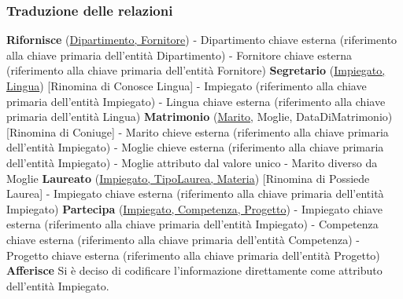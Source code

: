 \documentclass{article}
\begin{document}
\subsubsection{Traduzione delle relazioni}
\textbf{Rifornisce} (\underline{Dipartimento, Fornitore})
\newline
- Dipartimento chiave esterna (riferimento alla chiave primaria dell'entità Dipartimento)
\newline
- Fornitore chiave esterna (riferimento alla chiave primaria dell'entità Fornitore)
\newline
\newline
\textbf{Segretario} (\underline{Impiegato, Lingua}) [Rinomina di Conosce Lingua]
\newline
- Impiegato (riferimento alla chiave primaria dell'entità Impiegato)
\newline
- Lingua chiave esterna (riferimento alla chiave primaria dell'entità Lingua)
\newline
\newline
\textbf{Matrimonio} (\underline{Marito}, Moglie, DataDiMatrimonio) [Rinomina di Coniuge]
\newline
- Marito chieve esterna (riferimento alla chiave primaria dell'entità Impiegato)
\newline
- Moglie chieve esterna (riferimento alla chiave primaria dell'entità Impiegato)
\newline
- Moglie attributo dal valore unico
\newline
- Marito diverso da Moglie
\newline
\newline
\textbf{Laureato} (\underline{Impiegato, TipoLaurea, Materia}) [Rinomina di Possiede Laurea]
\newline
- Impiegato chiave esterna (riferimento alla chiave primaria dell'entità Impiegato)
\newline
\newline
\textbf{Partecipa} (\underline{Impiegato, Competenza, Progetto})
\newline
- Impiegato chiave esterna (riferimento alla chiave primaria dell'entità Impiegato)
\newline
- Competenza chiave esterna (riferimento alla chiave primaria dell'entità Competenza)
\newline
- Progetto chiave esterna (riferimento alla chiave primaria dell'entità Progetto)
\newline
\newline
\textbf{Afferisce}
\newline
Si è deciso di codificare l'informazione direttamente come attributo dell'entità Impiegato.
\end{document}

